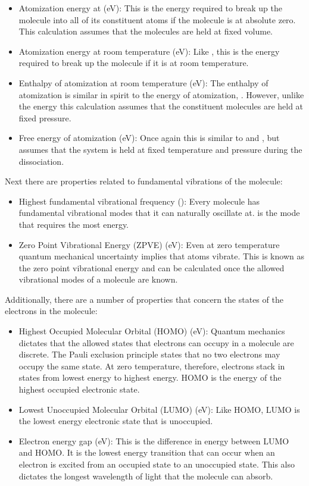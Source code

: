 \documentclass{article}
\begin{document}
\iffalse
\begin{itemize}
    \item Atomization energy at   (eV): This is the energy required to break up the molecule into all of its constituent atoms if the molecule is at absolute zero. This calculation assumes that the molecules are held at fixed volume.
    \item Atomization energy at room temperature  (eV): Like , this is the energy required to break up the molecule if it is at room temperature. \item Enthalpy of atomization at room temperature  (eV): The enthalpy of atomization is similar in spirit to the energy of atomization, . However, unlike the energy this calculation assumes that the constituent molecules are held at fixed pressure.
    \item Free energy of atomization  (eV): Once again this is similar to  and , but assumes that the system is held at fixed temperature and pressure during the dissociation. 
\end{itemize}
Next there are properties related to fundamental vibrations of the molecule:
\begin{itemize}
    \item Highest fundamental vibrational frequency  (): Every molecule has fundamental vibrational modes that it can naturally oscillate at.  is the mode that requires the most energy.
    \item Zero Point Vibrational Energy (ZPVE) (eV): Even at zero temperature quantum mechanical uncertainty implies that atoms vibrate. This is known as the zero point vibrational energy and can be calculated once the allowed vibrational modes of a molecule are known.
\end{itemize}
Additionally, there are a number of properties that concern the states of the electrons in the molecule:
\begin{itemize}
    \item Highest Occupied Molecular Orbital (HOMO)  (eV): Quantum mechanics dictates that the allowed states that electrons can occupy in a molecule are discrete. The Pauli exclusion principle states that no two electrons may occupy the same state. At zero temperature, therefore, electrons stack in states from lowest energy to highest energy. HOMO is the energy of the highest occupied electronic state.
    \item Lowest Unoccupied Molecular Orbital (LUMO)  (eV): Like HOMO, LUMO is the lowest energy electronic state that is unoccupied.
    \item Electron energy gap  (eV): This is the difference in energy between LUMO and HOMO. It is the lowest energy transition that can occur when an electron is excited from an occupied state to an unoccupied state. This also dictates the longest wavelength of light that the molecule can absorb.
\end{itemize}
\end{document}
